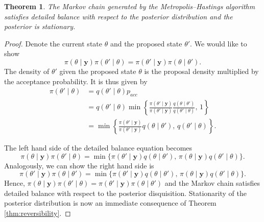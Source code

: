 \documentclass[
]{book}
\newtheorem{theorem}{Theorem}[chapter]
\theoremstyle{definition}
\theoremstyle{definition}
\theoremstyle{definition}
\theoremstyle{definition}
\theoremstyle{remark}
\begin{document}
\begin{theorem}
The Markov chain generated by the Metropolis--Hastings algorithm satisfies detailed balance with respect to the posterior distribution and the posterior is stationary.
\end{theorem}

\begin{proof}
Denote the current state \(\theta\) and the proposed state \(\theta'\). We would like to show
\[
\pi(\theta \mid \boldsymbol{y}) \pi(\theta'\mid\theta) = \pi(\theta' \mid \boldsymbol{y}) \pi(\theta\mid\theta').
\]
The density of \(\theta'\) given the proposed state \(\theta\) is the proposal density multiplied by the acceptance probability. It is thus given by
\begin{align*}
\pi(\theta' \mid \theta) &= q(\theta' \mid \theta)p_{acc}\\
&=  q(\theta' \mid \theta)\min\left\{\frac{\pi(\theta' \mid \boldsymbol{y})}{\pi(\theta' \mid \boldsymbol{y})}\frac{q(\theta \mid \theta')}{q(\theta' \mid \theta)}, \, 1\right\} \\
& = \min\left\{\frac{\pi(\theta' \mid \boldsymbol{y})}{\pi(\theta' \mid \boldsymbol{y})}q(\theta \mid \theta'),\, q(\theta' \mid \theta)\right\}.
\end{align*}

The left hand side of the detailed balance equation becomes
\[
\pi(\theta \mid \boldsymbol{y})\pi(\theta' \mid \theta) = \min\{\pi(\theta' \mid \boldsymbol{y})q(\theta \mid \theta'),\, \pi(\theta \mid \boldsymbol{y})q(\theta' \mid \theta)\}.
\]
Analogously, we can show the right hand side is
\[
\pi(\theta' \mid \boldsymbol{y})\pi(\theta \mid \theta') = \min\{\pi(\theta' \mid \boldsymbol{y})q(\theta \mid \theta'),\, \pi(\theta \mid \boldsymbol{y})q(\theta' \mid \theta)\}.
\]
Hence, \(\pi(\theta \mid \boldsymbol{y}) \pi(\theta'\mid\theta) = \pi(\theta' \mid \boldsymbol{y}) \pi(\theta\mid\theta')\) and the Markov chain satisfies detailed balance with respect to the posterior disquisition. Stationarity of the posterior distribution is now an immediate consequence of Theorem \ref{thm:reversibility}.
\end{proof}
\end{document}
